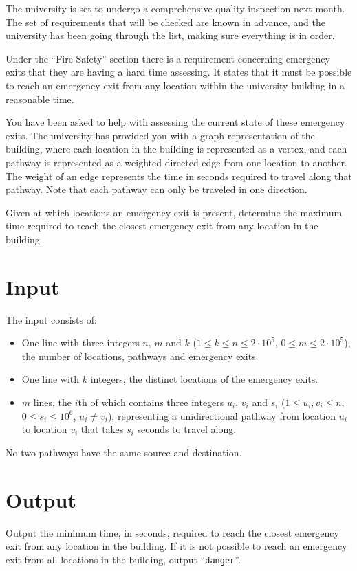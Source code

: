 
%
The university is set to undergo a comprehensive quality inspection next month.
The set of requirements that will be checked are known in advance, and the
university has been going through the list, making sure everything is in order.

Under the ``Fire Safety'' section there is a requirement concerning emergency
exits that they are having a hard time assessing. It states that it must be
possible to reach an emergency exit from any location within the university
building in a reasonable time.

You have been asked to help with assessing the current state of these emergency
exits. The university has provided you with a graph representation of the
building, where each location in the building is represented as a vertex, and
each pathway is represented as a weighted directed edge from one
location to another. The weight of an edge represents the time in seconds
required to travel along that pathway. Note that each pathway can only be
traveled in one direction.

Given at which locations an emergency exit is present, determine the maximum
time required to reach the closest emergency exit from any location in the
building.

\section*{Input}
The input consists of:
\begin{itemize}
    \item One line with three integers $n$, $m$ and $k$ ($1 \le k \le n \le 2\cdot
    10^5$, $0 \le m \le 2\cdot 10^5$), the number of locations, pathways and
    emergency exits.
    \item One line with $k$ integers, the distinct locations of the emergency
    exits.
    \item $m$ lines, the $i$th of which contains three integers $u_i$, $v_i$ and
    $s_i$ ($1 \le u_i,v_i \le n$, $0 \le s_i \le 10^6$, $u_i \neq v_i$),
    representing a unidirectional pathway from location $u_i$ to location $v_i$
    that takes $s_i$ seconds to travel along.
\end{itemize}

No two pathways have the same source and destination.

\section*{Output}
Output the minimum time, in seconds, required to reach the closest emergency exit
from any location in the building. If it is not possible to reach an emergency
exit from all locations in the building, output ``\texttt{danger}''.

